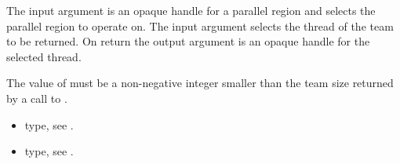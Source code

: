 \argdesc
The input argument  is an opaque handle for a parallel region
 and selects the parallel region to operate on.
The input argument  selects the thread of the team to be returned. 
On return the output argument  is an opaque handle for the selected thread.

\restrictions
The value of  must be a non-negative integer smaller than the
team size returned by a call to .

\crossreferences
\begin{itemize}
	\item {} type, see .
	\item {} type, see .
\end{itemize}

%
%
\label{ompd:ompd_get_master_thread_in_parallel}
%
%
%
%
%


